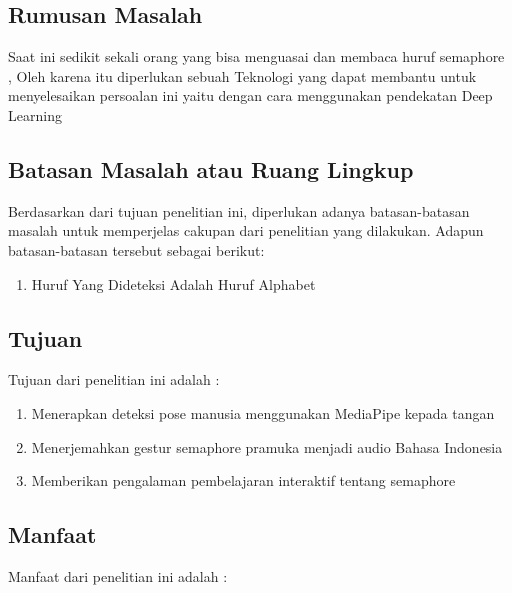 \subsection{Rumusan Masalah}

Saat ini sedikit sekali orang yang bisa menguasai dan membaca huruf semaphore , Oleh karena itu diperlukan sebuah Teknologi yang dapat membantu untuk menyelesaikan persoalan ini yaitu dengan cara menggunakan pendekatan Deep Learning 


\subsection{Batasan Masalah atau Ruang Lingkup}

Berdasarkan dari tujuan penelitian ini, diperlukan adanya batasan-batasan masalah untuk memperjelas cakupan dari penelitian yang dilakukan. Adapun batasan-batasan tersebut sebagai berikut:

\begin{enumerate}
\item Huruf Yang Dideteksi Adalah Huruf Alphabet 
\end{enumerate}


\subsection{Tujuan}




Tujuan dari penelitian ini adalah :

\begin{enumerate}   
\item	Menerapkan deteksi pose manusia menggunakan MediaPipe kepada tangan
\item	Menerjemahkan gestur semaphore pramuka menjadi audio Bahasa Indonesia
\item	Memberikan pengalaman pembelajaran interaktif tentang semaphore
\end{enumerate}


\subsection{Manfaat}

Manfaat dari penelitian ini adalah : 

